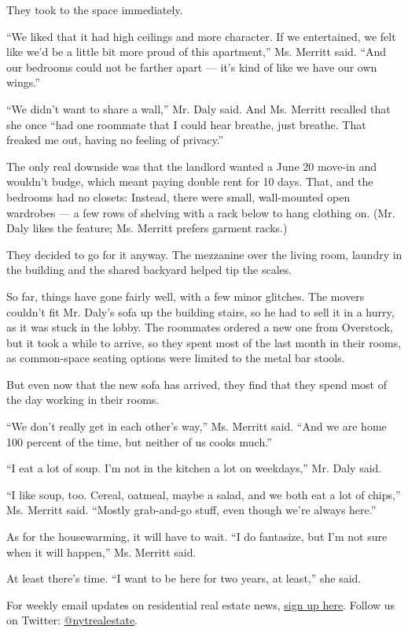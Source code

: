 They took to the space immediately.

``We liked that it had high ceilings and more character. If we
entertained, we felt like we'd be a little bit more proud of this
apartment,'' Ms. Merritt said. ``And our bedrooms could not be farther
apart --- it's kind of like we have our own wings.''

``We didn't want to share a wall,'' Mr. Daly said. And Ms. Merritt
recalled that she once ``had one roommate that I could hear breathe,
just breathe. That freaked me out, having no feeling of privacy.''

The only real downside was that the landlord wanted a June 20 move-in
and wouldn't budge, which meant paying double rent for 10 days. That,
and the bedrooms had no closets: Instead, there were small, wall-mounted
open wardrobes --- a few rows of shelving with a rack below to hang
clothing on. (Mr. Daly likes the feature; Ms. Merritt prefers garment
racks.)

They decided to go for it anyway. The mezzanine over the living room,
laundry in the building and the shared backyard helped tip the scales.

So far, things have gone fairly well, with a few minor glitches. The
movers couldn't fit Mr. Daly's sofa up the building stairs, so he had to
sell it in a hurry, as it was stuck in the lobby. The roommates ordered
a new one from Overstock, but it took a while to arrive, so they spent
most of the last month in their rooms, as common-space seating options
were limited to the metal bar stools.

But even now that the new sofa has arrived, they find that they spend
most of the day working in their rooms.

``We don't really get in each other's way,'' Ms. Merritt said. ``And we
are home 100 percent of the time, but neither of us cooks much.''

``I eat a lot of soup. I'm not in the kitchen a lot on weekdays,'' Mr.
Daly said.

``I like soup, too. Cereal, oatmeal, maybe a salad, and we both eat a
lot of chips,'' Ms. Merritt said. ``Mostly grab-and-go stuff, even
though we're always here.''

As for the housewarming, it will have to wait. ``I do fantasize, but I'm
not sure when it will happen,'' Ms. Merritt said.

At least there's time. ``I want to be here for two years, at least,''
she said.

For weekly email updates on residential real estate news,
\href{http://www.nytimes.com/newsletters/realestate/}{sign up here}.
Follow us on Twitter:
\href{https://twitter.com/nytrealestate}{@nytrealestate}.

